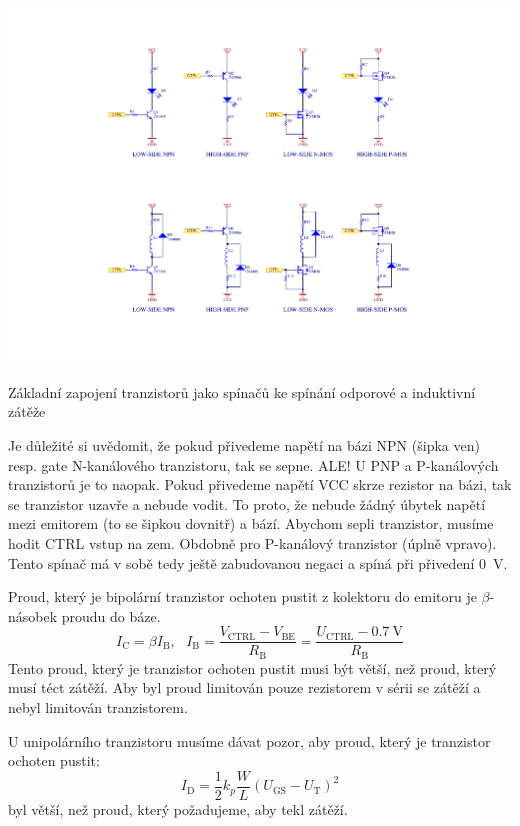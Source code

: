 \documentclass[a4paper,12pt]{article}   %
\begin{document}
\begin{schema}[h!]
    \centering
    \includegraphics[width=.9\textwidth]{tranzistory-spinace.pdf}
    \caption{Základní zapojení tranzistorů jako spínačů ke spínání odporové a induktivní zátěže}
\end{schema}
Je důležité si uvědomit, že pokud přivedeme napětí na bázi NPN (šipka ven) resp. gate N-kanálového tranzistoru, tak se sepne. ALE! U PNP a P-kanálových tranzistorů je to naopak. Pokud přivedeme napětí VCC skrze rezistor na bázi, tak se tranzistor uzavře a nebude vodit. To proto, že nebude žádný úbytek napětí mezi emitorem (to se šipkou dovnitř) a bází. Abychom sepli tranzistor, musíme hodit CTRL vstup na zem. Obdobně pro P-kanálový tranzistor (úplně vpravo). Tento spínač má v sobě tedy ještě zabudovanou negaci a spíná při přivedení 0~V.

Proud, který je bipolární tranzistor ochoten pustit z kolektoru do emitoru je $\beta$-násobek proudu do báze.
\begin{equation*}
    I_\text{C} = \beta I_\text{B}, ~~~I_\text{B} = \frac{V_\text{CTRL} - V_\text{BE}}{R_\text{B}} = \frac{U_\text{CTRL} - 0.7~\text{V}}{R_\text{B}}
\end{equation*}
Tento proud, který je tranzistor ochoten pustit musi být větší, než proud, který musí téct zátěží. Aby byl proud limitován pouze rezistorem v sérii se zátěží a nebyl limitován tranzistorem.

U unipolárního tranzistoru musíme dávat pozor, aby proud, který je tranzistor ochoten pustit:
\begin{equation*}
    I_\text{D} = \frac{1}{2}k_p \frac{W}{L} (U_\text{GS} - U_\text{T})^2
\end{equation*}
byl větší, než proud, který požadujeme, aby tekl zátěží.
\end{document}
